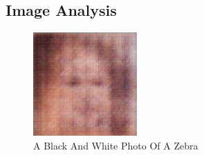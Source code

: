 \documentclass{article}%
\begin{document}
%
\subsection{Image Analysis}%
\label{subsec:ImageAnalysis}%


\begin{figure}[h!]%
\centering%
\includegraphics[width=150px]{500_fake_images/samples_5_321.png}%
\caption{A Black And White Photo Of A Zebra}%
\end{figure}

%
\end{document}
